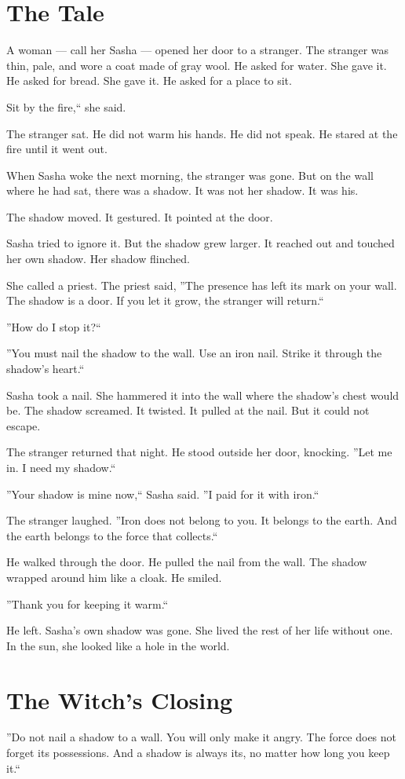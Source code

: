 \documentclass[10pt,twoside]{book}
\begin{document}
\section*{The Tale}
A woman --- call her Sasha --- opened her door to a stranger. The stranger was thin, pale, and wore a coat made of gray wool. He asked for water. She gave it. He asked for bread. She gave it. He asked for a place to sit.

Sit by the fire,`` she said.

The stranger sat. He did not warm his hands. He did not speak. He stared at the fire until it went out.

When Sasha woke the next morning, the stranger was gone. But on the wall where he had sat, there was a shadow. It was not her shadow. It was his.

The shadow moved. It gestured. It pointed at the door.

Sasha tried to ignore it. But the shadow grew larger. It reached out and touched her own shadow. Her shadow flinched.

She called a priest. The priest said, ''The presence has left its mark on your wall. The shadow is a door. If you let it grow, the stranger will return.``

''How do I stop it?``

''You must nail the shadow to the wall. Use an iron nail. Strike it through the shadow's heart.``

Sasha took a nail. She hammered it into the wall where the shadow's chest would be. The shadow screamed. It twisted. It pulled at the nail. But it could not escape.

The stranger returned that night. He stood outside her door, knocking. ''Let me in. I need my shadow.``

''Your shadow is mine now,`` Sasha said. ''I paid for it with iron.``

The stranger laughed. ''Iron does not belong to you. It belongs to the earth. And the earth belongs to the force that collects.``

He walked through the door. He pulled the nail from the wall. The shadow wrapped around him like a cloak. He smiled.

''Thank you for keeping it warm.``

He left. Sasha's own shadow was gone. She lived the rest of her life without one. In the sun, she looked like a hole in the world.

\section*{The Witch's Closing}
''Do not nail a shadow to a wall. You will only make it angry. The force does not forget its possessions. And a shadow is always its, no matter how long you keep it.``
\end{document}
